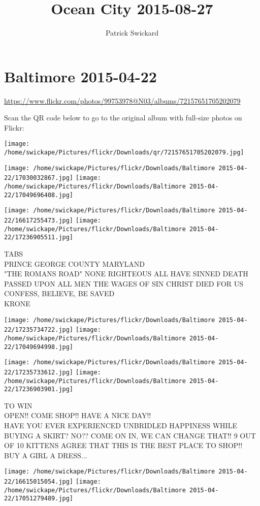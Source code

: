 \documentclass[10pt,letterpaper]{article}
\title{Ocean City 2015-08-27}
\author{Patrick Swickard}
\date{}
\begin{document}
\section*{Baltimore 2015-04-22}

\url{https://www.flickr.com/photos/99753978@N03/albums/72157651705202079}

Scan the QR code below to go to the original album with full-size photos on Flickr:

\texttt{[image: /home/swickape/Pictures/flickr/Downloads/qr/72157651705202079.jpg]}
\pagebreak

\texttt{[image: /home/swickape/Pictures/flickr/Downloads/Baltimore 2015-04-22/17030032867.jpg]}
\texttt{[image: /home/swickape/Pictures/flickr/Downloads/Baltimore 2015-04-22/17049696408.jpg]}

\texttt{[image: /home/swickape/Pictures/flickr/Downloads/Baltimore 2015-04-22/16617255473.jpg]}
\texttt{[image: /home/swickape/Pictures/flickr/Downloads/Baltimore 2015-04-22/17236905511.jpg]}

TABS\\
PRINCE GEORGE COUNTY MARYLAND\\
"THE ROMANS ROAD" NONE RIGHTEOUS ALL HAVE SINNED DEATH PASSED UPON ALL MEN THE WAGES OF SIN CHRIST DIED FOR US CONFESS, BELIEVE, BE SAVED\\
KRONE
\pagebreak

\texttt{[image: /home/swickape/Pictures/flickr/Downloads/Baltimore 2015-04-22/17235734722.jpg]}
\texttt{[image: /home/swickape/Pictures/flickr/Downloads/Baltimore 2015-04-22/17049694998.jpg]}

\texttt{[image: /home/swickape/Pictures/flickr/Downloads/Baltimore 2015-04-22/17235733612.jpg]}
\texttt{[image: /home/swickape/Pictures/flickr/Downloads/Baltimore 2015-04-22/17236903901.jpg]}

TO WIN\\
OPEN!!  COME SHOP!!  HAVE A NICE DAY!!\\
HAVE YOU EVER EXPERIENCED UNBRIDLED HAPPINESS WHILE BUYING A SKIRT?  NO??  COME ON IN, WE CAN CHANGE THAT!!  9 OUT OF 10 KITTENS AGREE THAT THIS IS THE BEST PLACE TO SHOP!!\\
BUY A GIRL A DRESS...
\pagebreak

\texttt{[image: /home/swickape/Pictures/flickr/Downloads/Baltimore 2015-04-22/16615015054.jpg]}
\texttt{[image: /home/swickape/Pictures/flickr/Downloads/Baltimore 2015-04-22/17051279489.jpg]}
\end{document}
